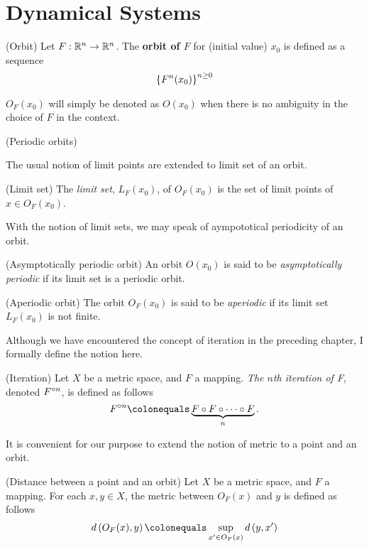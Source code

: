 \documentclass[12pt,twoside,draft]{book}
\begin{document}
\section{Dynamical Systems}

\begin{definition}
  (Orbit)
  Let $F: \mathbb{R}^n \to \mathbb{R}^n$. 
  The \textbf{orbit of $F$} for (initial value) $x_0$ is defined as a sequence
  \begin{equation*}
    \left \{ F^n(x_0) \right \}^{n\geq 0}_{ }
  \end{equation*}
  \label{def:orbit}
\end{definition}
$O_F(x_0)$ will simply be denoted as $O(x_0)$ when there is no ambiguity in the choice of $F$ in the context.

\begin{definition}
  (Periodic orbits)
  \label{def:porbit}
\end{definition}

The usual notion of limit points are extended to limit set of an orbit.
\begin{definition}
  (Limit set)
  The \textit{limit set}, $L_F(x_0)$, of $O_F(x_0)$ is the set of limit points of $x \in O_F(x_0)$.
  \label{def:limset}
\end{definition}

With the notion of limit sets, we may speak of aympototical periodicity of an orbit.
\begin{definition}
  (Asymptotically periodic orbit)
  An orbit $O(x_0)$ is said to be \textit{asymptotically periodic} if its limit set is a periodic orbit.
  \label{def:asymporb}
\end{definition}

\begin{definition}
  (Aperiodic orbit)
  The orbit $O_F(x_0)$ is said to be \textit{aperiodic} if its limit set $L_F(x_0)$ is not finite.
  \label{def:aporbit}
\end{definition}

Although we have encountered the concept of iteration in the preceding chapter, I formally define the notion here.
\begin{definition}
  (Iteration)
  Let $X$ be a metric space, and $F$ a mapping.
  \textit{The $n$th iteration of F}, denoted $F^{\circ n}$, is defined as follows
  \begin{equation*}
    \itr{F}{n} \ceq \underbrace{F \circ F \circ \cdots \circ F}_{n} .
  \end{equation*}
\end{definition}
%
It is convenient for our purpose to extend the notion of metric to a point and an orbit.
\begin{definition}
  (Distance between a point and an orbit)
  Let $X$ be a metric space, and $F$ a mapping.
  For each $x,y \in X$, the metric between $O_F(x)$ and $y$ is defined as follows
  \begin{equation*}
    \metric{O_F(x),y} \ceq \sup\limits_{x' \in O_F(x)} \metric{y,x'}
  \end{equation*}
\end{definition}
\end{document}
